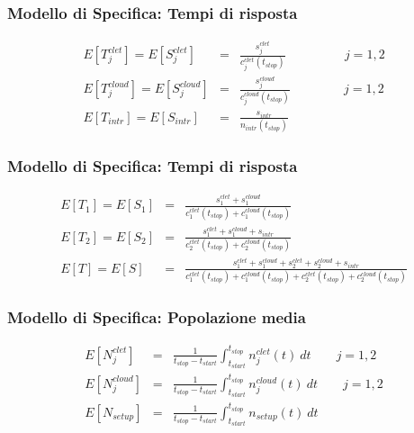 \begin{frame}
\frametitle{Modello di Specifica: Tempi di risposta}
\setlength\arraycolsep{2pt}
\begin{eqnarray*}
\label{eq:sjclet}
E[T_j^{clet}] = E[S_j^{clet}] &=& \frac{s_j^{clet}}{c_j^{clet}(t_{stop})}
\ \qquad \ \qquad \ j = 1, 2 
\\[30pt]
\label{eq:sjcloud}
E[T_j^{cloud}] = E[S_j^{cloud}] &=&
\frac{s_j^{cloud}}{c_j^{cloud}(t_{stop})}
\qquad \ \qquad j = 1, 2 
\\[30pt]
\label{eq:sintr}
E[T_{intr}] = E[S_{intr}] & = &
\frac{s_{intr}}{n_{intr}(t_{stop})}
\end{eqnarray*}
\end{frame}
\begin{frame}
\frametitle{Modello di Specifica: Tempi di risposta}
\setlength\arraycolsep{2pt}
\begin{eqnarray*}
\label{eq:s1}
E[T_1] = E[S_1] & = &
\frac{s_1^{clet} + s_1^{cloud}}{c_1^{clet}(t_{stop}) + c_1^{cloud}(t_{stop})}
\\[30pt]
\label{eq:s2}
E[T_2] = E[S_2] & = &
\frac{s_1^{clet} + s_1^{cloud} + s_{intr}}{c_2^{clet}(t_{stop}) +
c_2^{cloud}(t_{stop})} \\[30pt]
\label{eq:s}
E[T] = E[S] & = &
\frac{s_1^{clet} + s_1^{cloud} + s_2^{clet} + s_2^{cloud} + s_{intr}}
{c_1^{clet}(t_{stop}) + c_1^{cloud}(t_{stop}) + c_2^{clet}(t_{stop}) +
c_2^{cloud}(t_{stop})} 
\end{eqnarray*}
\end{frame}
\begin{frame}
\frametitle{Modello di Specifica: Popolazione media}

\setlength\arraycolsep{2pt}
\begin{eqnarray*}
\label{eq:njclet}
E[N_j^{clet}] & = &
\frac{1}{t_{stop} - t_{start}} 
\displaystyle \int_{t_{start}}^{t_{stop}} n_j^{clet}(t) \ dt
\qquad j = 1, 2 
\\[30pt]
\label{eq:njcloud}
E[N_j^{cloud}] & = &
\frac{1}{t_{stop} - t_{start}} 
\displaystyle \int_{t_{start}}^{t_{stop}} n_j^{cloud}(t) \ dt
\qquad j = 1, 2 
\\[30pt]
\label{eq:nsetup}
E[N_{setup}] & = &
\frac{1}{t_{stop} - t_{start}} 
\displaystyle \int_{t_{start}}^{t_{stop}} n_{setup}(t) \ dt
\end{eqnarray*}
\end{frame}

